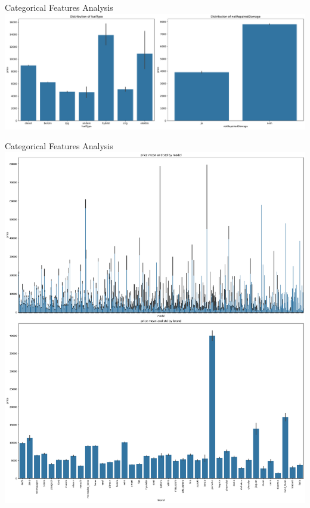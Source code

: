 \documentclass{beamer}
\begin{document}
\begin{frame}{Categorical Features Analysis}
        \center
        \includegraphics[scale=0.22]{cat_features_barplots2.pdf}
\end{frame}
\begin{frame}{Categorical Features Analysis}
        \center
        \includegraphics[scale=0.165]{model_brand_barplot.pdf}
\end{frame}
\end{document}
